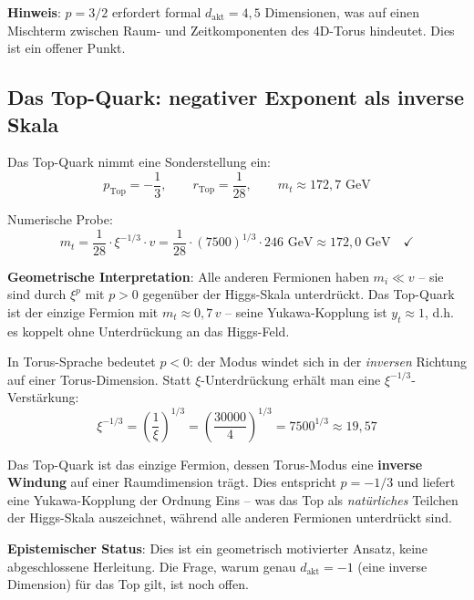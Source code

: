\textbf{Hinweis}: $p = 3/2$ erfordert formal $d_{\text{akt}} = 4{,}5$
Dimensionen, was auf einen Mischterm zwischen Raum- und
Zeitkomponenten des 4D-Torus hindeutet. Dies ist ein offener Punkt.

\subsection{Das Top-Quark: negativer Exponent als inverse Skala}

Das Top-Quark nimmt eine Sonderstellung ein:
\begin{equation}
    p_{\text{Top}} = -\frac{1}{3}, \qquad
    r_{\text{Top}} = \frac{1}{28}, \qquad
    m_t \approx 172{,}7 \text{ GeV}
\end{equation}

Numerische Probe:
\begin{equation}
    m_t = \frac{1}{28} \cdot \xi^{-1/3} \cdot v
    = \frac{1}{28} \cdot (7500)^{1/3} \cdot 246 \text{ GeV}
    \approx 172{,}0 \text{ GeV} \quad \checkmark
\end{equation}

\textbf{Geometrische Interpretation}: Alle anderen Fermionen haben
$m_i \ll v$ -- sie sind durch $\xi^p$ mit $p > 0$ gegenüber der
Higgs-Skala unterdrückt. Das Top-Quark ist der einzige Fermion mit
$m_t \approx 0{,}7\,v$ -- seine Yukawa-Kopplung ist $y_t \approx 1$,
d.h. es koppelt ohne Unterdrückung an das Higgs-Feld.

In Torus-Sprache bedeutet $p < 0$: der Modus windet sich in der
\emph{inversen} Richtung auf einer Torus-Dimension. Statt
$\xi$-Unterdrückung erhält man eine $\xi^{-1/3}$-Verstärkung:
\begin{equation}
    \xi^{-1/3} = \left(\frac{1}{\xi}\right)^{1/3}
    = \left(\frac{30000}{4}\right)^{1/3}
    = 7500^{1/3} \approx 19{,}57
\end{equation}

\begin{predbox}
Das Top-Quark ist das einzige Fermion, dessen Torus-Modus eine
\textbf{inverse Windung} auf einer Raumdimension trägt. Dies
entspricht $p = -1/3$ und liefert eine Yukawa-Kopplung der Ordnung
Eins -- was das Top als \emph{natürliches} Teilchen der Higgs-Skala
auszeichnet, während alle anderen Fermionen unterdrückt sind.
\end{predbox}

\textbf{Epistemischer Status}: Dies ist ein geometrisch motivierter
Ansatz, keine abgeschlossene Herleitung. Die Frage, warum genau
$d_{\text{akt}} = -1$ (eine inverse Dimension) für das Top gilt,
ist noch offen.

